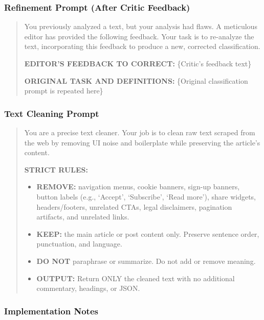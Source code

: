 \subsubsection{Refinement Prompt (After Critic Feedback)}

\begin{small}
\begin{quote}
You previously analyzed a text, but your analysis had flaws. A meticulous editor has provided the following feedback. Your task is to re-analyze the text, incorporating this feedback to produce a new, corrected classification.

\textbf{EDITOR'S FEEDBACK TO CORRECT:} \{Critic's feedback text\}

\textbf{ORIGINAL TASK AND DEFINITIONS:} \{Original classification prompt is repeated here\}
\end{quote}
\end{small}

\subsubsection{Text Cleaning Prompt}

\begin{small}
\begin{quote}
You are a precise text cleaner. Your job is to clean raw text scraped from the web by removing UI noise and boilerplate while preserving the article's content.

\textbf{STRICT RULES:}
\begin{itemize}
\item \textbf{REMOVE:} navigation menus, cookie banners, sign-up banners, button labels (e.g., `Accept', `Subscribe', `Read more'), share widgets, headers/footers, unrelated CTAs, legal disclaimers, pagination artifacts, and unrelated links.
\item \textbf{KEEP:} the main article or post content only. Preserve sentence order, punctuation, and language.
\item \textbf{DO NOT} paraphrase or summarize. Do not add or remove meaning.
\item \textbf{OUTPUT:} Return ONLY the cleaned text with no additional commentary, headings, or JSON.
\end{itemize}
\end{quote}
\end{small}

\subsubsection{Implementation Notes}

